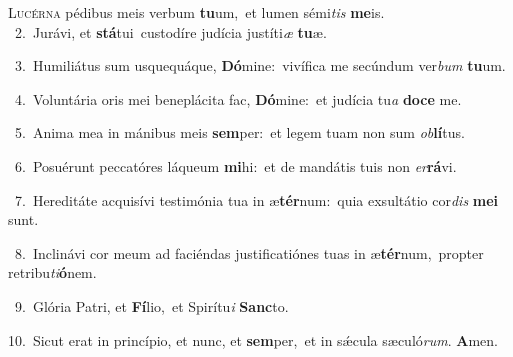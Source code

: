 \lettrine{\initial\textcolor{\initialcolor}{L}}{ucérna} pédibus meis verbum \textbf{tu}\-um,~\star et lumen sémi\textit{tis} \textbf{me}\-is.\\
{\numbfont\textcolor{\numbcolor}{~2.}}~Jurávi, et \textbf{stá}\-tui~\star custodíre judícia justíti\textit{æ} \textbf{tu}\-æ.\par
{\numbfont\textcolor{\numbcolor}{~3.}}~Humiliátus sum usquequáque, \textbf{Dó}\-mine:~\star vivífica me secúndum ver\textit{bum} \textbf{tu}\-um.\par
{\numbfont\textcolor{\numbcolor}{~4.}}~Voluntária oris mei beneplácita fac, \textbf{Dó}\-mine:~\star et judícia tu\textit{a} \textbf{do}\-\textbf{ce} me.\par
{\numbfont\textcolor{\numbcolor}{~5.}}~Anima mea in mánibus meis \textbf{sem}\-per:~\star et legem tuam non sum \textit{ob}\-\textbf{lí}tus.\par
{\numbfont\textcolor{\numbcolor}{~6.}}~Posuérunt peccatóres láqueum \textbf{mi}\-hi:~\star et de mandátis tuis non \textit{er}\-\textbf{rá}vi.\par
{\numbfont\textcolor{\numbcolor}{~7.}}~Hereditáte acquisívi testimónia tua in æ\-\textbf{tér}\-num:~\star quia exsultátio cor\textit{dis} \textbf{me}\-\textbf{i} sunt.\par
{\numbfont\textcolor{\numbcolor}{~8.}}~Inclinávi cor meum ad faciéndas justificatiónes tuas in æ\-\textbf{tér}\-num,~\star propter retribu\-\textit{ti}\-\textbf{ó}nem.\par
{\numbfont\textcolor{\numbcolor}{~9.}}~Glória Patri, et \textbf{Fí}\-lio,~\star et Spirítu\textit{i} \textbf{Sanc}\-to.\par
{\numbfont\textcolor{\numbcolor}{10.}}~Sicut erat in princípio, et nunc, et \textbf{sem}\-per,~\star et in sǽcula sæculó\-\textit{rum}\-. \textbf{A}\-men.\par
